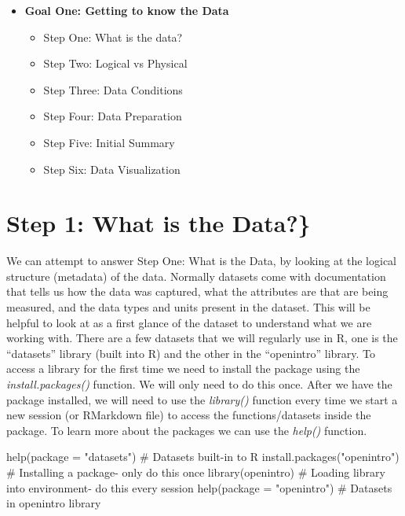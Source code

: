 \documentclass[
  letterpaper,
  DIV=11,
  numbers=noendperiod]{scrreprt}
\newenvironment{Shaded}{\begin{snugshade}}{\end{snugshade}}
\newcommand{\AttributeTok}[1]{\textcolor[rgb]{0.40,0.45,0.13}{#1}}
\newcommand{\CommentTok}[1]{\textcolor[rgb]{0.37,0.37,0.37}{#1}}
\newcommand{\FunctionTok}[1]{\textcolor[rgb]{0.28,0.35,0.67}{#1}}
\newcommand{\NormalTok}[1]{\textcolor[rgb]{0.00,0.23,0.31}{#1}}
\newcommand{\StringTok}[1]{\textcolor[rgb]{0.13,0.47,0.30}{#1}}
\providecommand{\tightlist}{%
  \setlength{\itemsep}{0pt}\setlength{\parskip}{0pt}}
\begin{document}
\begin{itemize}
\tightlist
\item
  \textbf{Goal One: Getting to know the Data}

  \begin{itemize}
  \tightlist
  \item
    Step One: What is the data?
  \item
    Step Two: Logical vs Physical
  \item
    Step Three: Data Conditions
  \item
    Step Four: Data Preparation
  \item
    Step Five: Initial Summary
  \item
    Step Six: Data Visualization
  \end{itemize}
\end{itemize}

\section{Step 1: What is the Data?\}}\label{step-1-what-is-the-data}

We can attempt to answer Step One: What is the Data, by looking at the
logical structure (metadata) of the data. Normally datasets come with
documentation that tells us how the data was captured, what the
attributes are that are being measured, and the data types and units
present in the dataset. This will be helpful to look at as a first
glance of the dataset to understand what we are working with. There are
a few datasets that we will regularly use in R, one is the ``datasets''
library (built into R) and the other in the ``openintro'' library. To
access a library for the first time we need to install the package using
the \emph{install.packages()} function. We will only need to do this
once. After we have the package installed, we will need to use the
\emph{library()} function every time we start a new session (or
RMarkdown file) to access the functions/datasets inside the package. To
learn more about the packages we can use the \emph{help()} function.

\begin{Shaded}
\begin{Highlighting}[]
\FunctionTok{help}\NormalTok{(}\AttributeTok{package =} \StringTok{"datasets"}\NormalTok{) }\CommentTok{\# Datasets built{-}in to R}
\FunctionTok{install.packages}\NormalTok{(}\StringTok{"openintro"}\NormalTok{) }\CommentTok{\# Installing a package{-} only do this once}
\FunctionTok{library}\NormalTok{(openintro) }\CommentTok{\# Loading library into environment{-} do this every session}
\FunctionTok{help}\NormalTok{(}\AttributeTok{package =} \StringTok{"openintro"}\NormalTok{) }\CommentTok{\# Datasets in openintro library}
\end{Highlighting}
\end{Shaded}
\end{document}
